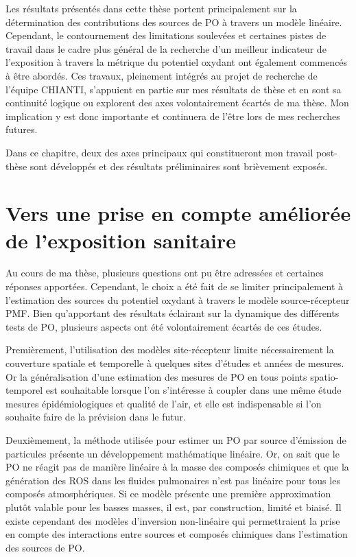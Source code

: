
Les résultats présentés dans cette thèse portent principalement sur la détermination des
contributions des sources de PO à travers un modèle linéaire.  Cependant, le contournement
des limitations soulevées et certaines pistes de travail dans le cadre plus général de la
recherche d'un meilleur indicateur de l'exposition à travers la métrique du potentiel
oxydant ont également commencés à être abordés.  Ces travaux, pleinement intégrés au
projet de recherche de l'équipe CHIANTI, s'appuient en partie sur mes résultats de thèse et
en sont sa continuité logique ou explorent des axes volontairement écartés de ma thèse.
Mon implication y est donc importante et continuera de l'être lors de mes recherches
futures.

Dans ce chapitre, deux des axes principaux qui constitueront mon travail post-thèse sont
développés et des résultats préliminaires sont brièvement exposés.

\section{Vers une prise en compte améliorée de l'exposition sanitaire}%

Au cours de ma thèse, plusieurs questions ont pu être adressées et certaines réponses
apportées.  Cependant, le choix a été fait de se limiter principalement à l'estimation des
sources du potentiel oxydant à travers le modèle source-récepteur PMF. Bien qu'apportant
des résultats éclairant sur la dynamique des différents tests de PO, plusieurs aspects ont
été volontairement écartés de ces études.

Premièrement, l'utilisation des modèles site-récepteur limite nécessairement la couverture
spatiale et temporelle à quelques sites d'études et années de mesures. Or la
généralisation d'une estimation des mesures de PO en tous points spatio-temporel est
souhaitable lorsque l'on s'intéresse à coupler dans une même étude mesures
épidémiologiques et qualité de l'air, et elle est indispensable si l'on souhaite faire de
la prévision dans le futur.

Deuxièmement, la méthode utilisée pour estimer un PO par source d'émission de particules
présente un développement mathématique linéaire. Or, on sait que le PO ne réagit pas de
manière linéaire à la masse des composés chimiques et que la génération des ROS dans les
fluides pulmonaires n'est pas linéaire pour tous les composés atmosphériques. Si ce modèle
présente une première approximation plutôt valable pour les basses masses, il est, par
construction, limité et biaisé.  Il existe cependant des modèles d'inversion non-linéaire
qui permettraient la prise en compte des interactions entre sources et composés chimiques
dans l'estimation des sources de PO.

